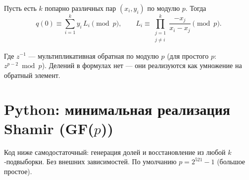 \documentclass[a4paper,12pt]{article}
\begin{document}
Пусть есть $k$ попарно различных пар $(x_i, y_i)$ по модулю $p$. Тогда
\begin{equation*}
q(0) \equiv \sum_{i=1}^{k} y_i \, L_i \pmod p,
\qquad
L_i \equiv \prod_{\substack{j=1\\ j\ne i}}^{k} \frac{-x_j}{x_i - x_j} \pmod p.
\end{equation*}

Где $z^{-1}$ — мультипликативная обратная по модулю $p$ (для простого $p$: $z^{p-2}\bmod p$). Делений в формулах нет — они реализуются как умножение на обратный элемент.

\section*{Python: минимальная реализация Shamir (GF($p$))}

Код ниже самодостаточный: генерация долей и восстановление из любой $k$‑подвыборки. Без внешних зависимостей. По умолчанию $p = 2^{521} - 1$ (большое простое).
\end{document}
